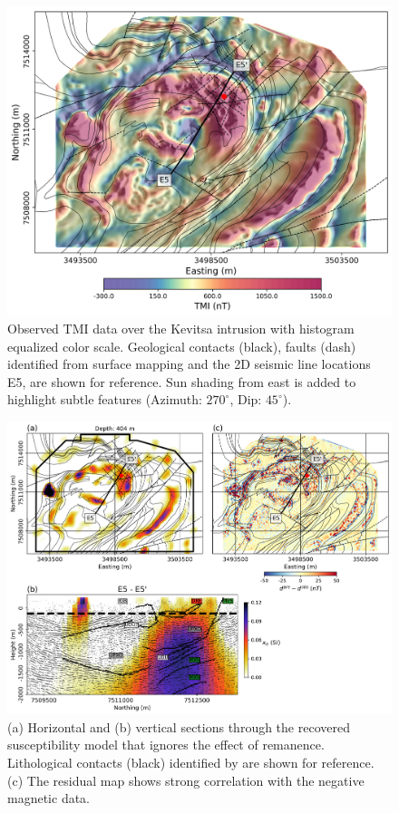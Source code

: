 \documentclass[paper]{geophysics}
\begin{document}
\begin{figure}[p!]
\includegraphics[width=\columnwidth]{Figures/Figure10.png}
\caption{Observed TMI data over the Kevitsa intrusion with histogram equalized color scale. Geological contacts (black), faults (dash) identified from surface mapping and the 2D seismic line locations E5, are shown for reference. Sun shading from east is added to highlight subtle features (Azimuth: $270^\circ$, Dip: $45^\circ$).}
\label{Kevitsa_TMI}
\end{figure}

\begin{figure}[p!]
\includegraphics[width=\columnwidth]{Figures/Figure11.png}
\caption{(a) Horizontal and (b) vertical sections through the recovered susceptibility model that ignores the effect of remanence. Lithological contacts (black) identified by \cite{Koivisto2015} are shown for reference. (c) The residual map shows strong correlation with the negative magnetic data.}
\label{MAG_lp_EW}
\end{figure}
\end{document}
